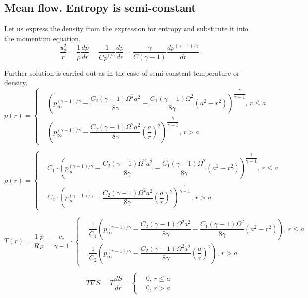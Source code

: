 \subsection{Mean flow. Entropy is semi-constant}

Let us express the density from the expression for entropy and substitute it into the momentum equation.
\begin{equation}
	\dfrac{u^2_{\theta}}{r} = \dfrac{1}{\rho}\dfrac{dp}{dr} = \dfrac{1}{C p^{1/\gamma}}\dfrac{dp}{dr} = \dfrac{\gamma}{C(\gamma - 1)}\dfrac{d p^{(\gamma - 1)/\gamma}}{dr}
\end{equation}

Further solution is carried out as in the case of semi-constant temperature or density.
\begin{equation}
	p(r) = \left\{
	\begin{aligned}
		& \left(p_{\infty}^{(\gamma - 1)/\gamma} - \dfrac{C_2(\gamma - 1)\Omega^2a^2}{8\gamma} - \dfrac{C_1(\gamma - 1)\Omega^2}{8\gamma}(a^2 - r^2)\right)^{\dfrac{\gamma}{\gamma - 1}}, \, r \leqslant a  \\
		& \left(p_{\infty}^{(\gamma - 1)/\gamma} - \dfrac{C_2(\gamma - 1)\Omega^2a^2}{8\gamma}\left(\dfrac{a}{r}\right)^2\right)^{\dfrac{\gamma}{\gamma - 1}}, \, r > a
	\end{aligned}
	\right.
\end{equation}

\begin{equation}
	\rho(r) = \left\{
	\begin{aligned}
		& C_1 \cdot \left(p_{\infty}^{(\gamma - 1)/\gamma} - \dfrac{C_2(\gamma - 1)\Omega^2a^2}{8\gamma} - \dfrac{C_1(\gamma - 1)\Omega^2}{8\gamma}(a^2 - r^2)\right)^{\dfrac{1}{\gamma - 1}}, \, r \leqslant a  \\
		& C_2 \cdot \left(p_{\infty}^{(\gamma - 1)/\gamma} - \dfrac{C_2(\gamma - 1)\Omega^2a^2}{8\gamma}\left(\dfrac{a}{r}\right)^2\right)^{\dfrac{1}{\gamma - 1}}, \, r > a
	\end{aligned}
	\right.
\end{equation}

\begin{equation}
	T(r) = \dfrac{1}{R} \dfrac{p}{\rho} = \dfrac{c_v}{\gamma - 1} \cdot \left\{
	\begin{aligned}
		& \dfrac{1}{C_1}\left(p_{\infty}^{(\gamma - 1)/\gamma} - \dfrac{C_2(\gamma - 1)\Omega^2a^2}{8\gamma} - \dfrac{C_1(\gamma - 1)\Omega^2}{8\gamma}(a^2 - r^2)\right), \, r \leqslant a  \\
		& \dfrac{1}{C_2}\left(p_{\infty}^{(\gamma - 1)/\gamma} - \dfrac{C_2(\gamma - 1)\Omega^2a^2}{8\gamma}\left(\dfrac{a}{r}\right)^2\right), \, r > a
	\end{aligned}
	\right.
\end{equation}

\begin{equation}
	T\nabla S = T \dfrac{dS}{dr} = \left\{
	\begin{aligned}
		& 0, \, r \leqslant a \\
		& 0, \, r > a
	\end{aligned}
	\right.
\end{equation}